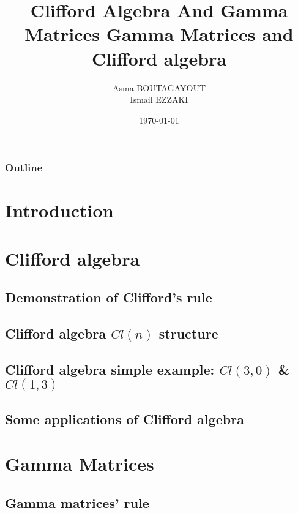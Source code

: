 \documentclass[serif,11pt]{beamer}
\title[ \hspace{0.8cm} \insertframenumber/\inserttotalframenumber]{{\sc Clifford Algebra And Gamma Matrices }}
\title[ \hspace{0.8cm} \insertframenumber/\inserttotalframenumber]{{\sc Gamma Matrices and Clifford algebra }}
\author{{Asma BOUTAGAYOUT \\ Ismail EZZAKI}}
\date  {\today}
\institute{University Cadi Ayyad \\Faculty of Sciences Semlalia \\ Physics Departement}
\begin{document}
\begin{frame}
  \begin{center}
    \vspace{0.1cm}
  \end{center}
\titlepage
\end{frame}

\begin{frame}
  \frametitle{Outline}
	\tableofcontents
\end{frame}

\section{Introduction}




\section{Clifford algebra}

\subsection{Demonstration of Clifford’s rule}

\subsection{Clifford algebra $Cl(n)$ structure}

\subsection{Clifford algebra simple example: $Cl(3,0)$ \& $Cl(1,3)$ }

\subsection{Some applications of Clifford algebra}

\section{ Gamma Matrices}
%
\subsection{Gamma matrices’ rule}

\end{document}
